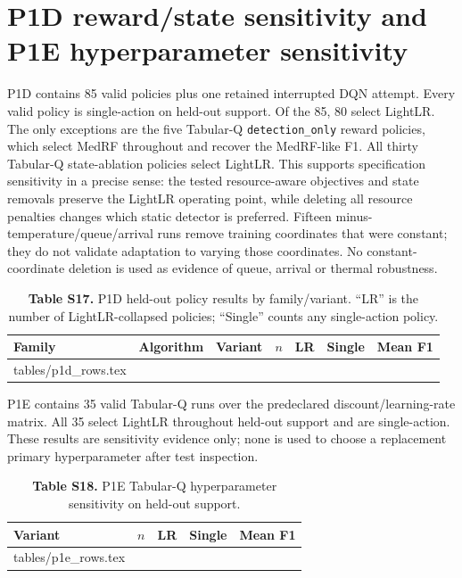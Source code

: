 \documentclass[10pt,a4paper]{article}
\makeatletter
\newcommand{\tableinput}[1]{\@@input #1.tex }
\makeatother
\begin{document}
\section{P1D reward/state sensitivity and P1E hyperparameter sensitivity}
P1D contains 85 valid policies plus one retained interrupted DQN attempt. Every valid policy is single-action on held-out support. Of the 85, 80 select LightLR. The only exceptions are the five Tabular-Q \texttt{detection\_only} reward policies, which select MedRF throughout and recover the MedRF-like F1. All thirty Tabular-Q state-ablation policies select LightLR. This supports specification sensitivity in a precise sense: the tested resource-aware objectives and state removals preserve the LightLR operating point, while deleting all resource penalties changes which static detector is preferred. Fifteen minus-temperature/queue/arrival runs remove training coordinates that were constant; they do not validate adaptation to varying those coordinates. No constant-coordinate deletion is used as evidence of queue, arrival or thermal robustness.

\begin{table}[h!]
\centering\footnotesize
\caption*{\textbf{Table S17.} P1D held-out policy results by family/variant. ``LR'' is the number of LightLR-collapsed policies; ``Single'' counts any single-action policy.}
\setlength{\tabcolsep}{3.2pt}
\begin{tabular}{lllrrrr}\toprule
Family & Algorithm & Variant & $n$ & LR & Single & Mean F1\\\midrule
\tableinput{tables/p1d_rows}
\bottomrule\end{tabular}
\end{table}

P1E contains 35 valid Tabular-Q runs over the predeclared discount/learning-rate matrix. All 35 select LightLR throughout held-out support and are single-action. These results are sensitivity evidence only; none is used to choose a replacement primary hyperparameter after test inspection.

\begin{table}[h!]
\centering\footnotesize
\caption*{\textbf{Table S18.} P1E Tabular-Q hyperparameter sensitivity on held-out support.}
\begin{tabular}{lrrrr}\toprule
Variant & $n$ & LR & Single & Mean F1\\\midrule
\tableinput{tables/p1e_rows}
\bottomrule\end{tabular}
\end{table}
\end{document}
